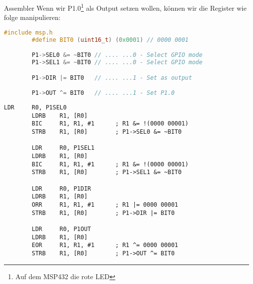 \begin{example}{Assembler}
    Wenn wir P1.0\footnote{Auf dem MSP432 die rote LED} als Output setzen wollen, können wir die Register wie folge manipulieren:

    \begin{lstlisting}[language=c]
        #include msp.h
        #define BIT0 (uint16_t) (0x0001) // 0000 0001

        P1->SEL0 &= ~BIT0 // .... ...0 - Select GPIO mode
        P1->SEL1 &= ~BIT0 // .... ...0 - Select GPIO mode

        P1->DIR |= BIT0   // .... ...1 - Set as output

        P1->OUT ^= BIT0   // .... ...1 - Set P1.0
    \end{lstlisting}

    \begin{lstlisting}[language={[x86masm]Assembler}]
        LDR     R0, P1SEL0
        LDRB    R1, [R0]
        BIC     R1, R1, #1      ; R1 &= !(0000 00001)
        STRB    R1, [R0]        ; P1->SEL0 &= ~BIT0

        LDR     R0, P1SEL1
        LDRB    R1, [R0]
        BIC     R1, R1, #1      ; R1 &= !(0000 00001)
        STRB    R1, [R0]        ; P1->SEL1 &= ~BIT0

        LDR     R0, P1DIR
        LDRB    R1, [R0]
        ORR     R1, R1, #1      ; R1 |= 0000 00001
        STRB    R1, [R0]        ; P1->DIR |= BIT0

        LDR     R0, P1OUT
        LDRB    R1, [R0]
        EOR     R1, R1, #1      ; R1 ^= 0000 00001
        STRB    R1, [R0]        ; P1->OUT ^= BIT0
    \end{lstlisting}
\end{example}